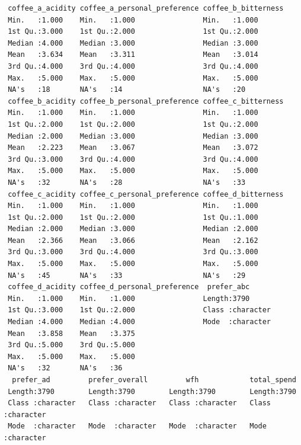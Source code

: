 \documentclass[
  letterpaper,
  DIV=11,
  numbers=noendperiod]{scrartcl}
\begin{document}
\begin{verbatim}
 coffee_a_acidity coffee_a_personal_preference coffee_b_bitterness
 Min.   :1.000    Min.   :1.000                Min.   :1.000      
 1st Qu.:3.000    1st Qu.:2.000                1st Qu.:2.000      
 Median :4.000    Median :3.000                Median :3.000      
 Mean   :3.634    Mean   :3.311                Mean   :3.014      
 3rd Qu.:4.000    3rd Qu.:4.000                3rd Qu.:4.000      
 Max.   :5.000    Max.   :5.000                Max.   :5.000      
 NA's   :18       NA's   :14                   NA's   :20         
 coffee_b_acidity coffee_b_personal_preference coffee_c_bitterness
 Min.   :1.000    Min.   :1.000                Min.   :1.000      
 1st Qu.:2.000    1st Qu.:2.000                1st Qu.:2.000      
 Median :2.000    Median :3.000                Median :3.000      
 Mean   :2.223    Mean   :3.067                Mean   :3.072      
 3rd Qu.:3.000    3rd Qu.:4.000                3rd Qu.:4.000      
 Max.   :5.000    Max.   :5.000                Max.   :5.000      
 NA's   :32       NA's   :28                   NA's   :33         
 coffee_c_acidity coffee_c_personal_preference coffee_d_bitterness
 Min.   :1.000    Min.   :1.000                Min.   :1.000      
 1st Qu.:2.000    1st Qu.:2.000                1st Qu.:1.000      
 Median :2.000    Median :3.000                Median :2.000      
 Mean   :2.366    Mean   :3.066                Mean   :2.162      
 3rd Qu.:3.000    3rd Qu.:4.000                3rd Qu.:3.000      
 Max.   :5.000    Max.   :5.000                Max.   :5.000      
 NA's   :45       NA's   :33                   NA's   :29         
 coffee_d_acidity coffee_d_personal_preference  prefer_abc       
 Min.   :1.000    Min.   :1.000                Length:3790       
 1st Qu.:3.000    1st Qu.:2.000                Class :character  
 Median :4.000    Median :4.000                Mode  :character  
 Mean   :3.858    Mean   :3.375                                  
 3rd Qu.:5.000    3rd Qu.:5.000                                  
 Max.   :5.000    Max.   :5.000                                  
 NA's   :32       NA's   :36                                     
  prefer_ad         prefer_overall         wfh            total_spend       
 Length:3790        Length:3790        Length:3790        Length:3790       
 Class :character   Class :character   Class :character   Class :character  
 Mode  :character   Mode  :character   Mode  :character   Mode  :character  
                                                                            
                                                                            
                                                                            

\end{verbatim}
\end{document}
